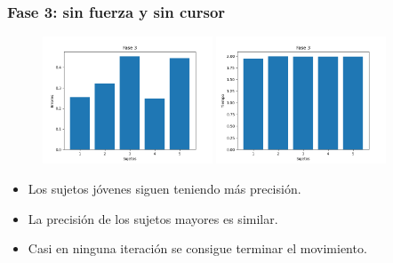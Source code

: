 \documentclass[pdf]{beamer}
\begin{document}
\begin{frame}
	\frametitle{Fase 3: sin fuerza y sin cursor}
	\begin{figure}
		\centering
		
		\includegraphics[width=0.45\textwidth]{fase3-errores}
			\includegraphics[width=0.45\textwidth]{fase3-time}
	\end{figure}
\begin{itemize}
	\item Los sujetos jóvenes siguen teniendo más precisión.
	\item La precisión de los sujetos mayores es similar.
	\item Casi en ninguna iteración se consigue terminar el movimiento.
\end{itemize}
\end{frame}
\end{document}

